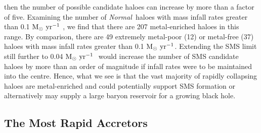 \documentclass[graphics, twocolumn, usenatbib]{mn2e}
\newcommand{\msolaryr} {$\rm{M_{\odot}~yr^{-1}}~$}
\newcommand{\msolaryrc} {$\rm{M_{\odot}~yr^{-1}}$}
\newcommand{\normal} {\textit{Normal~}}
\begin{document}
then the number of possible candidate haloes can increase by more than a factor of five.
Examining the number of \normal haloes with mass infall rates greater than 0.1 \msolaryr,
we find that there are 207 metal-enriched haloes in this range.
By comparison, there are 49 extremely metal-poor (12) or metal-free (37)
haloes with mass infall rates  greater than 0.1 \msolaryrc. Extending the
SMS limit still further to  0.04 \msolaryr \citep{Sakurai_2016} would increase the
number of SMS candidate haloes by more than an order of magnitude if infall
rates were to be maintained into the centre.
Hence, what we see is that the vast majority of rapidly collapsing haloes are metal-enriched
and could potentially support SMS formation or 
alternatively may supply a large baryon reservoir for a growing black hole. 


\subsection{The Most Rapid Accretors}
\end{document}
